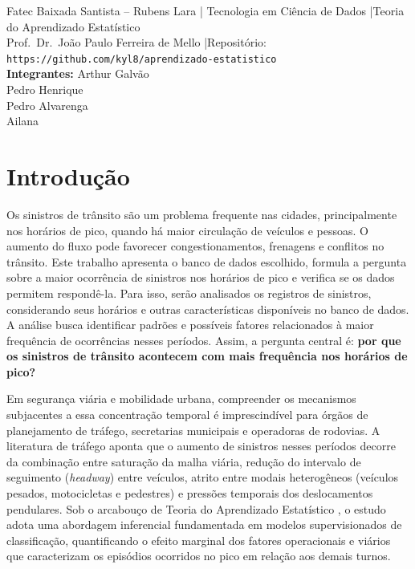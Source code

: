 \documentclass[
  article,
  12pt,
  oneside,
  a4paper,
  english,
  brazil
]{abntex2}\usepackage[]{graphicx}\usepackage[]{xcolor}
\newcommand{\nomecurso}{Tecnologia em Ciência de Dados}
\newcommand{\nomedisciplina}{Teoria do Aprendizado Estatístico}
\newcommand{\nomeprofessor}{Prof.\ Dr.\ João Paulo Ferreira de Mello}
\newcommand{\repositorio}{https://github.com/kyl8/aprendizado-estatistico}
\newcommand{\integrantes}{%
  Arthur Galvão \\
  Pedro Henrique \\
  Pedro Alvarenga \\
  Ailana%
}
\begin{document}
\frenchspacing

\maketitle

\begin{center}
  \footnotesize
  Fatec Baixada Santista -- Rubens Lara \quad|\quad
  \nomecurso{} \quad|\quad \nomedisciplina{} \\[0.2em]
  \nomeprofessor{} \quad|\quad Repositório: \texttt{\repositorio} \\[0.2em]
  \textbf{Integrantes:} \integrantes
\end{center}

\textual

\section{Introdução}

Os sinistros de trânsito são um problema frequente nas cidades, principalmente nos horários de pico, quando há maior circulação de veículos e pessoas. O aumento do fluxo pode favorecer congestionamentos, frenagens e conflitos no trânsito. Este trabalho apresenta o banco de dados escolhido, formula a pergunta sobre a maior ocorrência de sinistros nos horários de pico e verifica se os dados permitem respondê-la. Para isso, serão analisados os registros de sinistros, considerando seus horários e outras características disponíveis no banco de dados. A análise busca identificar padrões e possíveis fatores relacionados à maior frequência de ocorrências nesses períodos. Assim, a pergunta central é: \textbf{por que os sinistros de trânsito acontecem com mais frequência nos horários de pico?}

Em segurança viária e mobilidade urbana, compreender os mecanismos subjacentes a essa concentração temporal é imprescindível para órgãos de planejamento de tráfego, secretarias municipais e operadoras de rodovias. A literatura de tráfego aponta que o aumento de sinistros nesses períodos decorre da combinação entre saturação da malha viária, redução do intervalo de seguimento (\textit{headway}) entre veículos, atrito entre modais heterogêneos (veículos pesados, motocicletas e pedestres) e pressões temporais dos deslocamentos pendulares. Sob o arcabouço de Teoria do Aprendizado Estatístico \cite{james2021}, o estudo adota uma abordagem inferencial fundamentada em modelos supervisionados de classificação, quantificando o efeito marginal dos fatores operacionais e viários que caracterizam os episódios ocorridos no pico em relação aos demais turnos.
\end{document}
